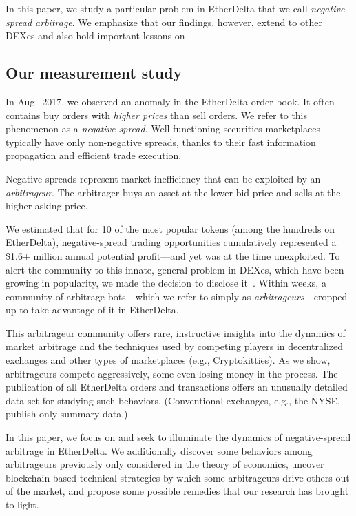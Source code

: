 \documentclass[conference]{IEEEtran}
\begin{document}
In this paper, we study a particular problem in EtherDelta that we call {\em negative-spread arbitrage}. We emphasize that our findings, however, extend to other DEXes and also hold important lessons on 

\subsection{Our measurement study}

In Aug.~2017, we observed an anomaly in the EtherDelta order book. It often contains buy orders with {\em higher prices} than sell orders. We refer to this phenomenon as a {\em negative spread}. Well-functioning securities marketplaces typically have only non-negative spreads, thanks to their fast information propagation and efficient trade execution. 

Negative spreads  represent market inefficiency that can be exploited by an {\em arbitrageur}. The arbitrager buys an asset at the lower bid price and sells at the higher asking price.

We estimated that for 10 of the most popular tokens (among the hundreds on EtherDelta), negative-spread trading opportunities cumulatively represented a \$1.6+ million annual potential profit---and yet was at the time unexploited. To alert the community to this innate, general problem in DEXes, which have been growing in popularity, we made the decision to disclose it~\cite{ED-Forbes-article:2017}. Within weeks, a community of arbitrage bots---which we refer to simply as {\em arbitrageurs}---cropped up to take advantage of it in EtherDelta.

This arbitrageur community offers rare, instructive insights into the dynamics of market arbitrage and the techniques used by competing players in decentralized exchanges and other types of marketplaces (e.g., Cryptokitties). As we show, arbitrageurs compete aggressively, some even losing money in the process. The publication of all EtherDelta orders and transactions offers an unusually detailed data set for studying such behaviors. (Conventional exchanges, e.g., the NYSE, publish only summary data.) 

In this paper, we focus on and seek to illuminate the dynamics of negative-spread arbitrage in EtherDelta. We additionally discover some behaviors among arbitrageurs previously only considered in the theory of economics, uncover blockchain-based technical strategies by which some arbitrageurs drive others out of the market, and propose some possible remedies that our research has brought to light.
\end{document}
